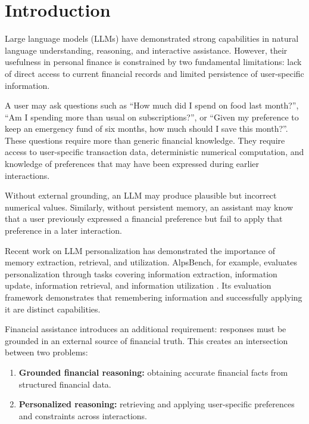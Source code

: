 \documentclass[conference]{IEEEtran}
\begin{document}
    
    \section{Introduction}
    
    Large language models (LLMs) have demonstrated strong capabilities in
    natural language understanding, reasoning, and interactive assistance.
    However, their usefulness in personal finance is constrained by two
    fundamental limitations: lack of direct access to current financial
    records and limited persistence of user-specific information.
    
    A user may ask questions such as ``How much did I spend on food last
    month?'', ``Am I spending more than usual on subscriptions?'', or
    ``Given my preference to keep an emergency fund of six months, how much
    should I save this month?''. These questions require more than generic
    financial knowledge. They require access to user-specific transaction
    data, deterministic numerical computation, and knowledge of preferences
    that may have been expressed during earlier interactions.
    
    Without external grounding, an LLM may produce plausible but incorrect
    numerical values. Similarly, without persistent memory, an assistant may
    know that a user previously expressed a financial preference but fail to
    apply that preference in a later interaction.
    
    Recent work on LLM personalization has demonstrated the importance of
    memory extraction, retrieval, and utilization. AlpsBench, for example,
    evaluates personalization through tasks covering information extraction,
    information update, information retrieval, and information utilization
    \cite{alpsbench}. Its evaluation framework demonstrates that remembering
    information and successfully applying it are distinct capabilities.
    
    Financial assistance introduces an additional requirement: responses
    must be grounded in an external source of financial truth. This creates
    an intersection between two problems:
    
    \begin{enumerate}
        \item \textbf{Grounded financial reasoning:} obtaining accurate
        financial facts from structured financial data.
        \item \textbf{Personalized reasoning:} retrieving and applying
        user-specific preferences and constraints across interactions.
    \end{enumerate}
    
\end{document}

